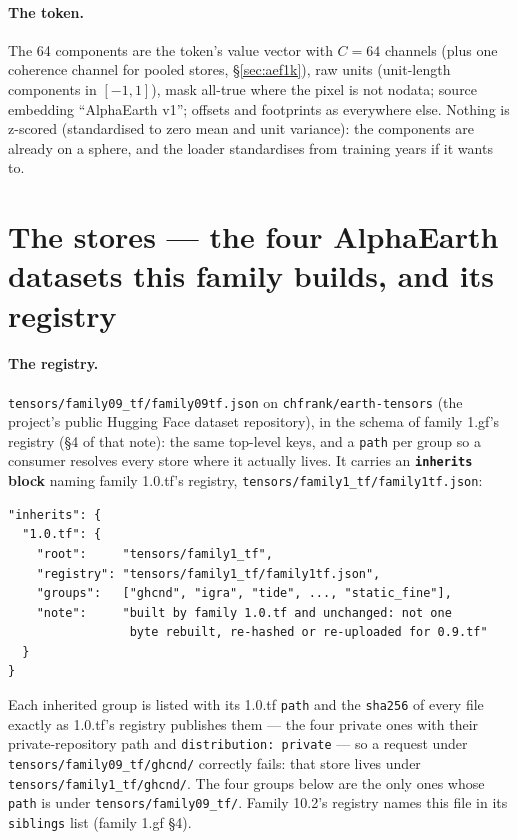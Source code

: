 \documentclass[10pt]{article}
\newcommand{\code}[1]{\texttt{#1}}
\begin{document}
\paragraph{The token.} The 64 components are the token's value vector with
$C = 64$ channels (plus one coherence channel for pooled stores, \S\ref{sec:aef1k}), raw units
(unit-length components in $[-1, 1]$), mask all-true where the pixel is not
nodata; source embedding ``AlphaEarth v1''; offsets and footprints as
everywhere else. Nothing is z-scored (standardised to zero mean and unit variance): the components are already on a
sphere, and the loader standardises from training years if it wants to.

\section{The stores --- the four AlphaEarth datasets this family builds, and its registry}
\label{sec:stores}

\paragraph{The registry.} \code{tensors/\allowbreak family09\_tf/\allowbreak family09tf.json}
on \code{chfrank/earth-tensors} (the project's public Hugging Face dataset
repository), in the schema of family 1.gf's registry (\S4 of that note): the
same top-level keys, and a \code{path} per group so a consumer resolves every
store where it actually lives. It carries an \textbf{\code{inherits} block}
naming family 1.0.tf's registry, \code{tensors/\allowbreak family1\_tf/\allowbreak family1tf.json}:
\begin{verbatim}
"inherits": {
  "1.0.tf": {
    "root":     "tensors/family1_tf",
    "registry": "tensors/family1_tf/family1tf.json",
    "groups":   ["ghcnd", "igra", "tide", ..., "static_fine"],
    "note":     "built by family 1.0.tf and unchanged: not one
                 byte rebuilt, re-hashed or re-uploaded for 0.9.tf"
  }
}
\end{verbatim}
Each inherited group is listed with its 1.0.tf \code{path} and the
\code{sha256} of every file exactly as 1.0.tf's registry publishes them ---
the four private ones with their private-repository path and
\code{distribution: private} --- so a request under
\code{tensors/\allowbreak family09\_tf/\allowbreak ghcnd/} correctly fails: that store lives under
\code{tensors/\allowbreak family1\_tf/\allowbreak ghcnd/}. The four groups below are the only ones
whose \code{path} is under \code{tensors/\allowbreak family09\_tf/}. Family 10.2's
registry names this file in its \code{siblings} list (family 1.gf \S4).
\end{document}
